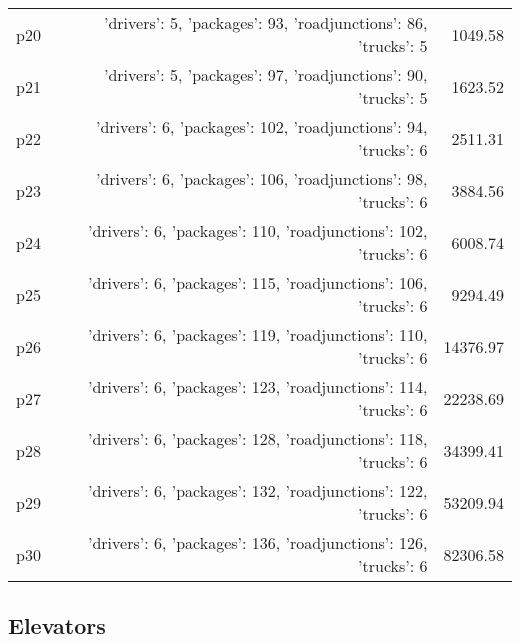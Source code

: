 \documentclass{article}
\begin{document}
\begin{center}
\begin{tabular}{@{}l|r|r@{}}
  p20&{'drivers': 5, 'packages': 93, 'roadjunctions': 86, 'trucks': 5}&1049.58\\
  p21&{'drivers': 5, 'packages': 97, 'roadjunctions': 90, 'trucks': 5}&1623.52\\
  p22&{'drivers': 6, 'packages': 102, 'roadjunctions': 94, 'trucks': 6}&2511.31\\
  p23&{'drivers': 6, 'packages': 106, 'roadjunctions': 98, 'trucks': 6}&3884.56\\
  p24&{'drivers': 6, 'packages': 110, 'roadjunctions': 102, 'trucks': 6}&6008.74\\
  p25&{'drivers': 6, 'packages': 115, 'roadjunctions': 106, 'trucks': 6}&9294.49\\
  p26&{'drivers': 6, 'packages': 119, 'roadjunctions': 110, 'trucks': 6}&14376.97\\
  p27&{'drivers': 6, 'packages': 123, 'roadjunctions': 114, 'trucks': 6}&22238.69\\
  p28&{'drivers': 6, 'packages': 128, 'roadjunctions': 118, 'trucks': 6}&34399.41\\
  p29&{'drivers': 6, 'packages': 132, 'roadjunctions': 122, 'trucks': 6}&53209.94\\
  p30&{'drivers': 6, 'packages': 136, 'roadjunctions': 126, 'trucks': 6}&82306.58
                            \end{tabular}
                            \end{center}
                    
                            \newpage \subsection{Elevators}
\end{document}
